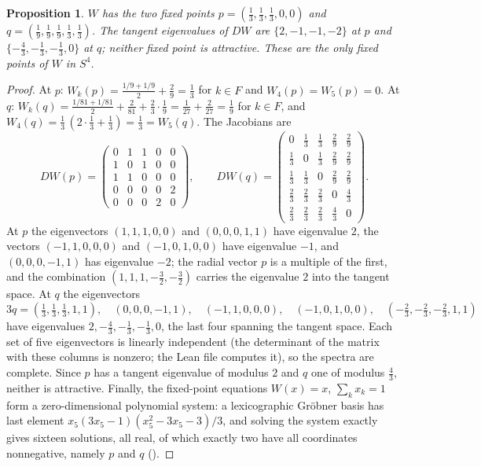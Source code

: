 \documentclass[11pt]{amsart}
\newtheorem{proposition}[theorem]{Proposition}
\theoremstyle{definition}
\begin{document}
\begin{proposition}\label{prop:five}
$W$ has the two fixed points $p=(\frac13,\frac13,\frac13,0,0)$ and $q=(\frac19,\frac19,\frac19,\frac13,\frac13)$. The tangent eigenvalues of $DW$ are $\{2,-1,-1,-2\}$ at $p$ and $\{-\frac43,-\frac13,-\frac13,0\}$ at $q$; neither fixed point is attractive. These are the only fixed points of $W$ in $S^4$.
\end{proposition}

\begin{proof}
At $p$: $W_k(p)=\frac{1/9+1/9}{2}+\frac29=\frac13$ for $k\in F$ and $W_4(p)=W_5(p)=0$. At $q$: $W_k(q)=\frac{1/81+1/81}{2}+\frac2{81}+\frac23\cdot\frac19=\frac1{27}+\frac2{27}=\frac19$ for $k\in F$, and $W_4(q)=\frac13\,(2\cdot\frac13+\frac13)=\frac13=W_5(q)$. The Jacobians are
\[
DW(p)=\begin{pmatrix}0&1&1&0&0\\1&0&1&0&0\\1&1&0&0&0\\0&0&0&0&2\\0&0&0&2&0\end{pmatrix},\qquad
DW(q)=\begin{pmatrix}0&\frac13&\frac13&\frac29&\frac29\\ \frac13&0&\frac13&\frac29&\frac29\\ \frac13&\frac13&0&\frac29&\frac29\\ \frac23&\frac23&\frac23&0&\frac43\\ \frac23&\frac23&\frac23&\frac43&0\end{pmatrix}.
\]
At $p$ the eigenvectors $(1,1,1,0,0)$ and $(0,0,0,1,1)$ have eigenvalue $2$, the vectors $(-1,1,0,0,0)$ and $(-1,0,1,0,0)$ have eigenvalue $-1$, and $(0,0,0,-1,1)$ has eigenvalue $-2$; the radial vector $p$ is a multiple of the first, and the combination $(1,1,1,-\frac32,-\frac32)$ carries the eigenvalue $2$ into the tangent space. At $q$ the eigenvectors
\[
3q=(\tfrac13,\tfrac13,\tfrac13,1,1),\quad (0,0,0,-1,1),\quad (-1,1,0,0,0),\quad (-1,0,1,0,0),\quad (-\tfrac23,-\tfrac23,-\tfrac23,1,1)
\]
have eigenvalues $2,-\frac43,-\frac13,-\frac13,0$, the last four spanning the tangent space. Each set of five eigenvectors is linearly independent (the determinant of the matrix with these columns is nonzero; the Lean file computes it), so the spectra are complete. Since $p$ has a tangent eigenvalue of modulus $2$ and $q$ one of modulus $\frac43$, neither is attractive. Finally, the fixed-point equations $W(x)=x$, $\sum_kx_k=1$ form a zero-dimensional polynomial system: a lexicographic Gr\"obner basis has last element $x_5(3x_5-1)(x_5^2-3x_5-3)/3$, and solving the system exactly gives sixteen solutions, all real, of which exactly two have all coordinates nonnegative, namely $p$ and $q$ ().
\end{proof}
\end{document}
